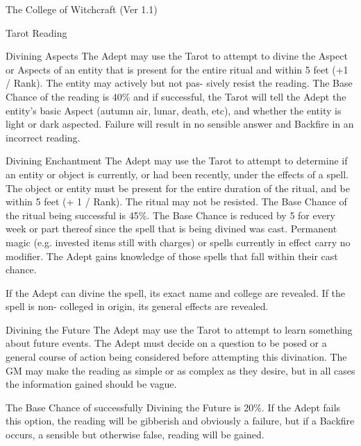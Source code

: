 \begin{Chapter}{The College of Witchcraft (Ver 1.1)}
\begin{ritual}[Q-2]{Tarot Reading }
\begin{effects}
Divining Aspects The Adept may use the Tarot to 
attempt to divine the Aspect or Aspects of an entity 
that is present for the entire ritual and within 5 feet 
(+1  /  Rank).  The  entity  may  actively  but  not  pas-
sively  resist  the  reading.  The  Base  Chance  of  the 
reading is 40\% and if successful, the Tarot will tell 
the  Adept  the  entity’s  basic  Aspect  (autumn  air, 
lunar, death, etc), and whether the entity is light or 
dark  aspected.  Failure  will  result  in  no  sensible 
answer and Backfire in an incorrect reading. 

Divining  Enchantment  The  Adept  may  use  the 
Tarot to attempt to determine if an entity or object 
is currently, or had been recently, under the effects 
of a spell. The object or entity must be present for 
the  entire  duration  of  the  ritual,  and  be  within  5 
feet  (+  1  /  Rank).  The  ritual  may  not  be  resisted. 
The  Base  Chance  of  the  ritual  being  successful  is 
45\%.  The  Base  Chance  is  reduced  by  5  for  every 
week  or  part  thereof  since  the  spell  that  is  being 
divined  was  cast.  Permanent  magic  (e.g.  invested 
items still with charges) or spells currently in effect 
carry  no  modifier.  The  Adept  gains  knowledge  of 
those spells that fall within their cast chance. 

If  the  Adept  can  divine  the  spell,  its  exact  name 
and  college  are  revealed.  If  the  spell  is  non-
colleged in origin, its general effects are revealed. 

Divining the Future The Adept may use the Tarot 
to  attempt  to  learn  something  about  future  events. 
The  Adept  must  decide  on  a  question  to  be  posed 
or  a  general  course  of  action  being  considered 
before  attempting  this  divination.  The  GM  may 
make  the  reading  as  simple  or  as  complex  as  they 
desire,  but  in  all  cases  the  information  gained 
should be vague. 

The  Base  Chance  of  successfully  Divining  the 
Future  is  20\%.  If  the  Adept  fails  this  option,  the 
reading  will  be  gibberish  and  obviously  a  failure, 
but  if  a  Backfire  occurs,  a  sensible  but  otherwise 
false, reading will be gained. 


\end{effects}
\end{ritual}
\end{Chapter}
